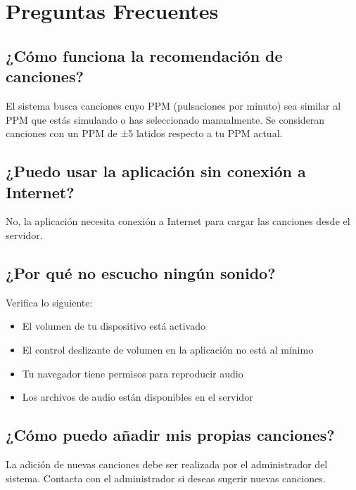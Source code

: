 \documentclass[a4paper,12pt]{article}
\begin{document}

\section{Preguntas Frecuentes}

\subsection{¿Cómo funciona la recomendación de canciones?}
El sistema busca canciones cuyo PPM (pulsaciones por minuto) sea similar al PPM que estás simulando o has seleccionado manualmente. Se consideran canciones con un PPM de ±5 latidos respecto a tu PPM actual.

\subsection{¿Puedo usar la aplicación sin conexión a Internet?}
No, la aplicación necesita conexión a Internet para cargar las canciones desde el servidor.

\subsection{¿Por qué no escucho ningún sonido?}
Verifica lo siguiente:
\begin{itemize}
    \item El volumen de tu dispositivo está activado
    \item El control deslizante de volumen en la aplicación no está al mínimo
    \item Tu navegador tiene permisos para reproducir audio
    \item Los archivos de audio están disponibles en el servidor
\end{itemize}

\subsection{¿Cómo puedo añadir mis propias canciones?}
La adición de nuevas canciones debe ser realizada por el administrador del sistema. Contacta con el administrador si deseas sugerir nuevas canciones.
\end{document}
